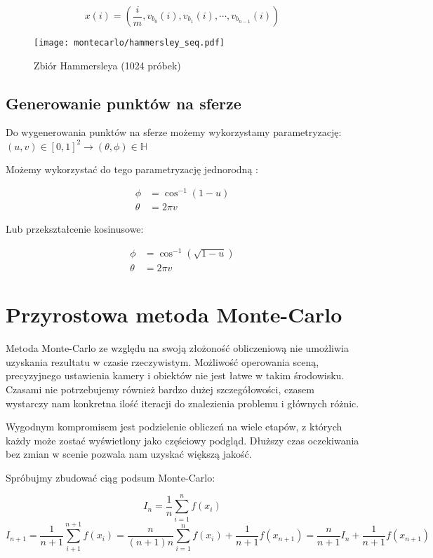 \documentclass[../main.tex]{subfiles}
\begin{document}
\[
  x(i) = \left(
    \frac{i}{m}, v_{b_0}(i), v_{b_1}(i), \cdots, v_{b_{n-1}}(i)
  \right)
\]

\begin{figure}[h]
  \centering
  \texttt{[image: montecarlo/hammersley\_seq.pdf]}
  \caption{Zbiór Hammersleya (1024 próbek)}
  \label{fig:HammersleySamples}
\end{figure}

\subsection{Generowanie punktów na sferze}

Do wygenerowania punktów na sferze możemy wykorzystamy parametryzację:
  $(u,v) \in [0,1]^2 \rightarrow (\theta, \phi) \in \mathbb{H}$

Możemy wykorzystać do tego parametryzację jednorodną \cite{dammertz_2012}:

\begin{align*}
	\phi &= \cos^{-1}(1-u) \\
	\theta &= 2 \pi v
\end{align*}

Lub przekształcenie kosinusowe:

\begin{align*}
  \phi &= \cos^{-1}(\sqrt{1-u}) \\
  \theta &= 2 \pi v
\end{align*}


\section{Przyrostowa metoda Monte-Carlo}

Metoda Monte-Carlo ze względu na swoją złożoność obliczeniową nie umożliwia
uzyskania rezultatu w czasie rzeczywistym. Możliwość operowania sceną,
precyzyjnego ustawienia kamery i obiektów nie jest łatwe w takim środowisku.
Czasami nie potrzebujemy również bardzo dużej szczegółowości, czasem wystarczy
nam konkretna ilość iteracji do znalezienia problemu i głównych różnic.

Wygodnym kompromisem jest podzielenie obliczeń na wiele etapów, z których każdy
może zostać wyświetlony jako częściowy podgląd. Dłuższy czas oczekiwania bez
zmian w scenie pozwala nam uzyskać większą jakość.

Spróbujmy zbudować ciąg podsum Monte-Carlo:

\[ I_n = \frac{1}{n} \sum_{i=1}^{n} f(x_i) \]
\[
  I_{n+1} = \frac{1}{n+1} \sum_{i+1}^{n+1}f(x_i)
    = \frac{n}{(n+1)n} \sum_{i=1}^{n}f(x_i) + \frac{1}{n+1}f(x_{n+1})
    = \frac{n}{n+1} I_{n} + \frac{1}{n+1}f(x_{n+1})
\]
\end{document}
